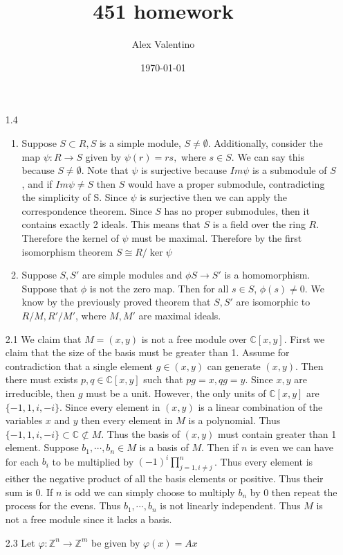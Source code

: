 \documentclass[12pt, letterpaper]{article}
\date{\today}
\author{Alex Valentino}
\title{451 homework}
\newcommand{\Z}{\mathbb{Z}}
\newcommand{\C}{\mathbb{C}}
\begin{document}
\begin{enumerate}
	\item[1.4]
	\begin{enumerate}
		\item Suppose $S \subset R, S$ is a simple module, $S \neq \emptyset$.  Additionally, consider the map $\psi : R \to S$ given by $\psi (r) = rs,$ where
		$s \in S$.  We can say this because $S \neq \emptyset$.  Note that $\psi$
		is surjective because $Im \psi$ is a submodule of $S$, and if $Im \psi \neq S$ then $S$ would have a proper submodule, contradicting the simplicity of S.
		Since $\psi$ is surjective then we can apply the correspondence theorem.
		Since $S$ has no proper submodules, then it contains exactly 2 ideals.  
		This means that $S$ is a field over the ring $R$.  Therefore the kernel 
		of $\psi$ must be maximal.  Therefore by the first isomorphism theorem 
		$S \cong R / \ker \psi $
		\item Suppose $S, S'$ are simple modules and $\phi S \to S'$ is a homomorphism.  Suppose that $\phi$ is not the zero map.  Then for all $s \in S$,
		$\phi(s) \neq 0$.  We know by the previously proved theorem that $S,S'$ are isomorphic to $R/M, R'/M'$, where $M,M'$ are maximal ideals.  
	\end{enumerate}
	\item[2.1] We claim that $M = (x,y)$ is not a free module over $\C[x,y]$.
	First we claim that the size of the basis must be greater than 1.  Assume for 
	contradiction that a single element $g \in (x,y)$ can generate $(x,y)$.  
	Then there must exists $p,q \in \C[x,y]$ such that $pg = x, qg = y$.  
	Since $x,y$ are irreducible, then $g$ must be a unit.  
	However, the only units of $\C[x,y]$ are $\{-1,1,i,-i\}$.  Since every element 
	in $(x,y)$ is a linear combination of the variables $x$ and $y$ then every 
	element in $M$ is a polynomial.  Thus $\{-1,1,i,-i\} \subset \C \not \subset M$.  Thus the basis of $(x,y)$ must contain greater than 1 element.  Suppose 
	$b_1,\cdots,b_n \in M$ is a basis of $M$.  Then if $n$ is even we can have 
	for each $b_i$ to be multiplied by $(-1)^i\prod_{j=1, i\neq j}^n$.  Thus every 
	element is either the negative product of all the basis elements or positive. 
	Thus their sum is 0.  If $n$ is odd we can simply choose to multiply $b_n$ by 0
	then repeat the process for the evens.  Thus $b_1,\cdots,b_n$ is not linearly 
	independent.  Thus $M$ is not a free module since it lacks a basis.  
	\item[2.3] Let $\varphi : \Z^n \to \Z^m$ be given by $\varphi(x) = Ax$

\end{enumerate}
\end{document}
